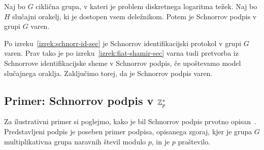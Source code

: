 \begin{izrek}
    Naj bo $G$ ciklična grupa, v kateri je problem diskretnega logaritma težek. Naj bo $H$ slučajni
    orakelj, ki je dostopen vsem deležnikom. Potem je Schnorrov podpis v grupi $G$ varen.
\end{izrek}

\begin{dokaz}
    Po izreku~\ref{izrek:schnorr-id-sec} je Schnorrov identifikacijski protokol v grupi $G$ varen.
    Prav tako je po izreku~\ref{izrek:fiat-shamir-sec} varna tudi pretvorba iz Schnorrove identifikacijske
    sheme v Schnorrov podpis, če upoštevamo model slučajnega oraklja. Zaključimo torej, da je
    Schnorrov podpis varen.
\end{dokaz}

\subsection{Primer: Schnorrov podpis v \texorpdfstring{$\mathbb Z_p^*$}{Zp∗}}
Za ilustrativni primer si poglejmo, kako je bil Schnorrov podpis prvotno opisan~\cite{schnorr1989sig}.
Predstavljeni podpis je poseben primer podpisa, opisanega zgoraj, kjer je grupa $G$ multiplikativna
grupa naravnih števil modulo $p$, in je $p$ praštevilo.
